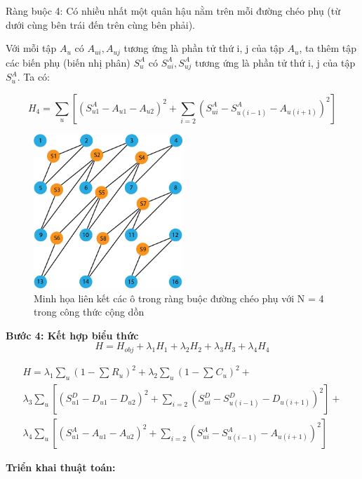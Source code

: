 Ràng buộc 4: Có nhiều nhất một quân hậu nằm trên mỗi đường chéo phụ (từ dưới cùng bên trái đến trên cùng bên phải).

Với mỗi tập $A_u$ có $A_{ui}, A_{uj}$ tương ứng là phần tử thứ i, j của tập $A_u$, ta thêm tập các biến phụ (biến nhị phân) $S_u^A $ có $S_{ui}^{A}, S_{uj}^{A}$ tương ứng là phần tử thứ i, j của tập $S_u^A$. Ta có:

\[
H_4 = \sum_{u}^{}{\left[ (S_{u1}^{A} - A_{u1} - A_{u2})^2 + \sum_{i=2}^{}{(S_{ui}^{A} - S_{u(i-1)}^{A} - A_{u(i+1)})^2}  \right]}
\]
\begin{figure}[H]
	\centering
	\includegraphics[width=0.5\textwidth]{images/anti_diag_add_constraint.png}
	\caption{Minh họa liên kết các ô trong ràng buộc đường chéo phụ với N = 4 trong công thức cộng dồn}
\end{figure}
\textbf{Bước 4: Kết hợp biểu thức}
\[
H =H_{obj}+\lambda_1 H_1+\lambda_2 H_2+\lambda_3 H_3+\lambda_4 H_4
\]


\begin{multline*}
	H =
	\lambda_1 \sum_{u}^{}{(1-\sum{}^{}{R_u})^2} + 
	\lambda_2 \sum_{u}^{}{(1-\sum{}^{}{C_u})^2} + \\
	\lambda_3 \sum_{u}^{}{\left[ (S_{u1}^{D} - D_{u1} - D_{u2})^2 + \sum_{i=2}^{}{(S_{ui}^{D} - S_{u(i-1)}^{D} - D_{u(i+1)})^2}  \right]} + \\
	\lambda_4 \sum_{u}^{}{\left[ (S_{u1}^{A} - A_{u1} - A_{u2})^2 + \sum_{i=2}^{}{(S_{ui}^{A} - S_{u(i-1)}^{A} - A_{u(i+1)})^2}  \right]}
 \nonumber
\end{multline*}

\textbf{Triển khai thuật toán:}

